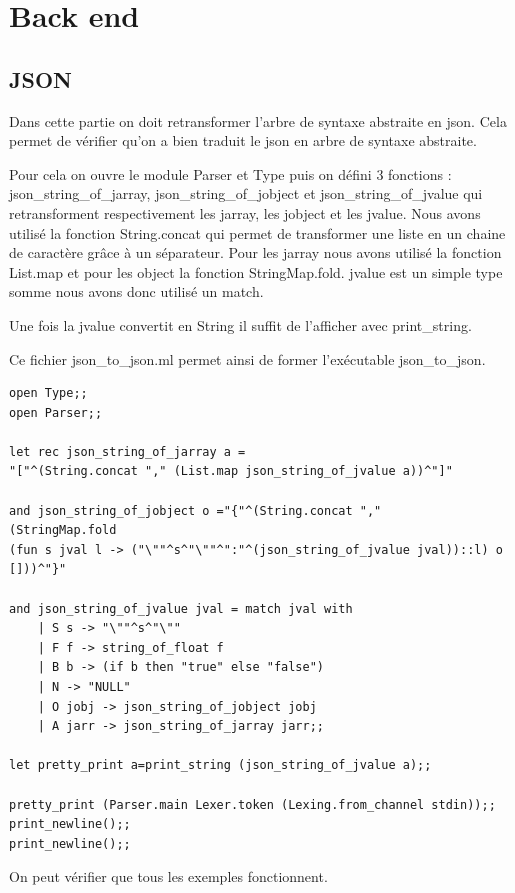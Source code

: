 \documentclass{report}
\begin{document}
\chapter{Back end}
\section{JSON}
\par
Dans cette partie on doit retransformer l'arbre de syntaxe abstraite en json. Cela permet de vérifier qu'on a bien traduit le json en arbre de syntaxe abstraite.

\par
Pour cela on ouvre le module Parser et Type puis on défini 3 fonctions : json\_string\_of\_jarray, json\_string\_of\_jobject et json\_string\_of\_jvalue qui retransforment respectivement les jarray, les jobject et les jvalue. Nous avons utilisé la fonction String.concat qui permet de transformer une liste en un chaine de caractère grâce à un séparateur. Pour les jarray nous avons utilisé la fonction List.map et pour les object la fonction StringMap.fold. jvalue est un simple type somme nous avons donc utilisé un match.

\par
Une fois la jvalue convertit en String il suffit de l'afficher avec print\_string.

\par
Ce fichier json\_to\_json.ml permet ainsi de former l'exécutable json\_to\_json.
\\
\begin{verbatim}
open Type;;
open Parser;;

let rec json_string_of_jarray a = 
"["^(String.concat "," (List.map json_string_of_jvalue a))^"]"
	
and json_string_of_jobject o ="{"^(String.concat "," 
(StringMap.fold 
(fun s jval l -> ("\""^s^"\""^":"^(json_string_of_jvalue jval))::l) o []))^"}"
	
and json_string_of_jvalue jval = match jval with
	| S s -> "\""^s^"\""
	| F f -> string_of_float f
	| B b -> (if b then "true" else "false")
	| N -> "NULL"
	| O jobj -> json_string_of_jobject jobj
	| A jarr -> json_string_of_jarray jarr;;
	
let pretty_print a=print_string (json_string_of_jvalue a);;

pretty_print (Parser.main Lexer.token (Lexing.from_channel stdin));;
print_newline();;
print_newline();;
\end{verbatim}
On peut vérifier que tous les exemples fonctionnent.
\end{document}
